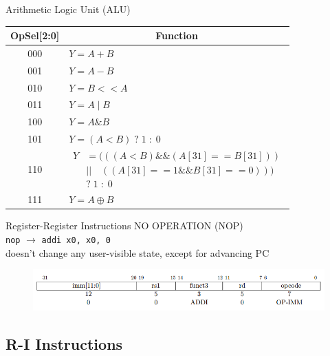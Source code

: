 \documentclass[UTF8]{ctexbeamer}
\begin{document}
\begin{frame}{Arithmetic Logic Unit (ALU)}
\begin{center}
\begin{tabular}{|c|l|}
    \hline
    OpSel[2:0] & \multicolumn{1}{c|}{Function}\\
    \hline
    000   & $Y=A+B$\\
    \hline
    001   & $Y=A-B$\\
    \hline
    010   & $Y=B<<A$ \\
    \hline
    011   & $Y=A\mid B$\\
    \hline
    100   & $Y=A\& B$\\
    \hline
    101   & $Y=(A<B)\;?\;1\;:\;0$\\
    \hline
    110   & \multicolumn{1}{p{7cm}|}{$\begin{aligned}
    Y&=(((A<B) \&\& (A[31] == B[31] ))\\
    &||\quad( ( A[31] ==1 \&\& B[31] == 0)))\\
    &?\;1\;:\;0
    \end{aligned}$}\\
    \hline
    111   & $Y=A\oplus B$\\
    \hline
\end{tabular}
\end{center}
\end{frame}

\begin{frame}[fragile]{Register-Register Instructions}
NO OPERATION (NOP)\\
\verb'nop' $\to$ \verb'addi x0, x0, 0'\\
doesn't change any user-visible state, except for advancing PC
\begin{figure}
\centering
\includegraphics[width=\linewidth]{fig/Lecture2/nop.PNG}
\end{figure}
\end{frame}

\subsection{R-I Instructions}
\begin{frame}
\subsectionpage
\end{frame}
\end{document}
